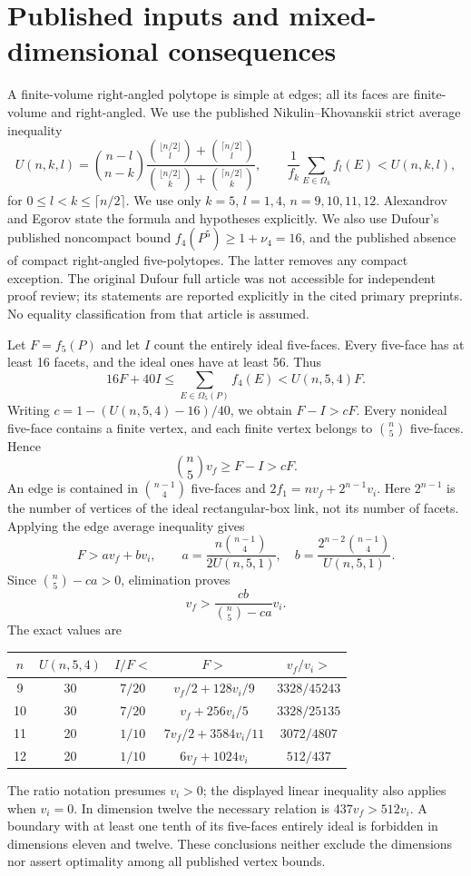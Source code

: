 \documentclass[11pt]{article}
\begin{document}
\section{Published inputs and mixed-dimensional consequences}
A finite-volume right-angled polytope is simple at edges; all its faces
are finite-volume and right-angled. We use the published
Nikulin--Khovanskii strict average inequality
\[
 U(n,k,l)=\binom{n-l}{n-k}
 \frac{\binom{\lfloor n/2\rfloor}{l}+\binom{\lceil n/2\rceil}{l}}
 {\binom{\lfloor n/2\rfloor}{k}+\binom{\lceil n/2\rceil}{k}},
 \qquad
 \frac1{f_k}\sum_{E\in\Omega_k}f_l(E)<U(n,k,l),
\]
for $0\le l<k\le\lceil n/2\rceil$. We use only $k=5$, $l=1,4$,
$n=9,10,11,12$. Alexandrov \cite{Alexandrov} and Egorov
\cite{Egorov} state the formula and hypotheses explicitly.
We also use Dufour's published noncompact bound
$f_4(P^5)\ge1+\nu_4=16$, and the published absence of compact
right-angled five-polytopes. The latter removes any compact exception.
The original Dufour full article was not accessible for independent
proof review; its statements are reported explicitly in the cited
primary preprints. No equality classification from that article is assumed.

Let $F=f_5(P)$ and let $I$ count the entirely ideal five-faces. Every
five-face has at least 16 facets, and the ideal ones have at least 56.
Thus
\[
 16F+40I\le\sum_{E\in\Omega_5(P)}f_4(E)<U(n,5,4)F.
\]
Writing $c=1-(U(n,5,4)-16)/40$, we obtain $F-I>cF$.
Every nonideal five-face contains a finite vertex, and each finite
vertex belongs to $\binom n5$ five-faces. Hence
\[
 \binom n5v_f\ge F-I>cF.
\]
An edge is contained in $\binom{n-1}{4}$ five-faces and
$2f_1=nv_f+2^{n-1}v_i$. Here $2^{n-1}$ is the number of vertices of
the ideal rectangular-box link, not its number of facets. Applying the
edge average inequality gives
\[
 F>a v_f+b v_i,\qquad
 a=\frac{n\binom{n-1}{4}}{2U(n,5,1)},\quad
 b=\frac{2^{n-2}\binom{n-1}{4}}{U(n,5,1)}.
\]
Since $\binom n5-ca>0$, elimination proves
\[
 v_f>\frac{cb}{\binom n5-ca}v_i.
\]
The exact values are
\begin{center}
\begin{tabular}{ccccc}\toprule
$n$&$U(n,5,4)$&$I/F<$&$F>$&$v_f/v_i>$\\\midrule
9&30&$7/20$&$v_f/2+128v_i/9$&$3328/45243$\\
10&30&$7/20$&$v_f+256v_i/5$&$3328/25135$\\
11&20&$1/10$&$7v_f/2+3584v_i/11$&$3072/4807$\\
12&20&$1/10$&$6v_f+1024v_i$&$512/437$\\\bottomrule
\end{tabular}
\end{center}
The ratio notation presumes $v_i>0$; the displayed linear inequality
also applies when $v_i=0$. In dimension twelve the necessary relation is
$437v_f>512v_i$. A boundary with at least one tenth of its five-faces
entirely ideal is forbidden in dimensions eleven and twelve. These
conclusions neither exclude the dimensions nor assert optimality among
all published vertex bounds.
\end{document}
